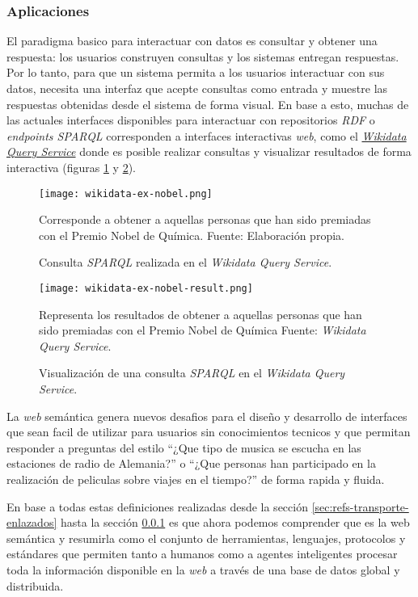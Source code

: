 \subsubsection{Aplicaciones}
\label{sec:aplicaciones}

El paradigma basico para interactuar con datos es consultar y obtener una
respuesta: los usuarios construyen consultas y los sistemas entregan respuestas.
Por lo tanto, para que un sistema permita a los usuarios interactuar con sus
datos, necesita una interfaz que acepte consultas como entrada y muestre las
respuestas obtenidas desde el sistema de forma visual. En base a esto, muchas de
las actuales interfaces disponibles para interactuar con repositorios
\textit{RDF} o \textit{endpoints SPARQL} corresponden a interfaces interactivas
\textit{web}, como el \href{https://query.wikidata.org}{\textit{Wikidata Query
Service}} donde es posible realizar consultas y visualizar resultados de forma
interactiva (figuras \ref{fig:wikidata-ex-nobel} y
\ref{fig:wikidata-ex-nobel-result}).

\begin{figure}
    \centering
    \texttt{[image: wikidata-ex-nobel.png]}
    \caption{Consulta \textit{SPARQL} realizada en el \textit{Wikidata Query
    Service}.} Corresponde a obtener a aquellas personas que han sido premiadas
    con el Premio Nobel de Química. Fuente: Elaboración propia.
    \label{fig:wikidata-ex-nobel}
\end{figure}

\begin{figure}
    \centering
    \texttt{[image: wikidata-ex-nobel-result.png]}
    \caption{Visualización de una consulta \textit{SPARQL} en el
    \textit{Wikidata Query Service}.} Representa los resultados de obtener a
    aquellas personas que han sido premiadas con el Premio Nobel de Química
    Fuente: \textit{Wikidata Query Service}.
    \label{fig:wikidata-ex-nobel-result}
\end{figure}

La \textit{web} semántica genera nuevos desafios para el diseño y desarrollo de
interfaces que sean facil de utilizar para usuarios sin conocimientos tecnicos y
que permitan responder a preguntas del estilo ``¿Que tipo de musica se escucha
en las estaciones de radio de Alemania?'' o ``¿Que personas han participado en
la realización de peliculas sobre viajes en el tiempo?'' de forma rapida y
fluida.

En base a todas estas definiciones realizadas desde la sección
\ref{sec:refs-transporte-enlazados} hasta la sección \ref{sec:aplicaciones} es
que ahora podemos comprender que es la web semántica y resumirla como el
conjunto de herramientas, lenguajes, protocolos y estándares que permiten tanto
a humanos como a agentes inteligentes procesar toda la información disponible en
la \textit{web} a través de una base de datos global y distribuida.

